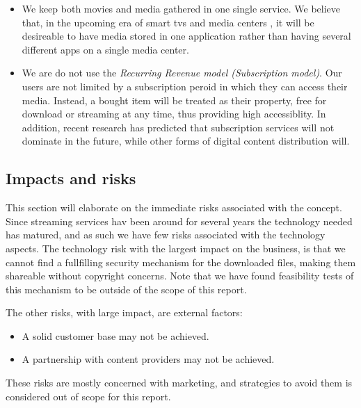 \begin{itemize}
    \item We keep both movies and media gathered in one single service. We believe that, 
        in the upcoming era of smart tvs and media centers \cite{smarttv}, it will be
        desireable to have media stored in one application rather than having several
        different apps on a single media center.
    \item We are do not use the \emph{Recurring Revenue model (Subscription model)}\cite{businessmodel}. Our users are not limited by a subscription peroid in which they can access their media. Instead, a bought item will be treated as their property, free for download or streaming at any time, thus providing high accessiblity. In addition, recent research\cite{ott} has predicted that subscription services will not dominate in the future, while other forms of digital content distribution will.
\end{itemize}
    
\subsection{Impacts and risks}
This section will elaborate on the immediate risks associated with the concept. Since
streaming services hav been around for several years the technology needed has matured,
and as such we have few risks associated with the technology aspects. The technology
risk with the largest impact on the business, is that we cannot find a fullfilling
security mechanism for the downloaded files, making them shareable without copyright concerns. Note that
we have found feasibility tests of this mechanism to be outside of the scope of this
report.

The other risks, with large impact, are external factors:
\begin{itemize}
\item A solid customer base may not be achieved.
\item A partnership with content providers may not be achieved.
\end{itemize}

These risks are mostly concerned with marketing, and strategies to avoid them is considered out of scope for this report.
